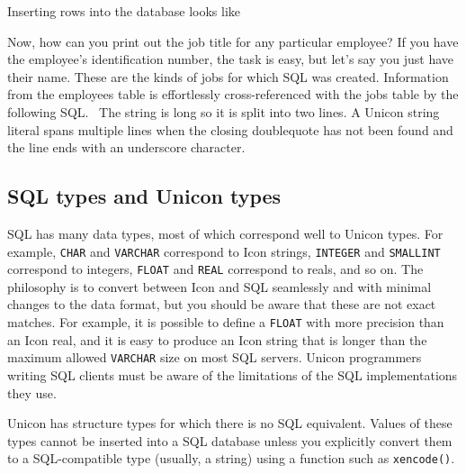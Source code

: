 
\noindent
Inserting rows into the database looks like


Now, how can you print out the job title for any particular employee? If
you have the employee's identification number, the
task is easy, but let's say you just have their name.
These are the kinds of jobs for which SQL was created. Information from
the employees table is effortlessly cross-referenced with the jobs
table by the following SQL. \ The string is long so it is split into
two lines. A Unicon string literal spans multiple lines when the
closing doublequote has not been found and the line ends with an
underscore character.


\subsection{SQL types and Unicon types}

SQL has many data types, most of which correspond well to Unicon types.
For example, \texttt{CHAR} and \texttt{VARCHAR} correspond to Icon
strings, \texttt{INTEGER} and \texttt{SMALLINT} correspond to integers,
\texttt{FLOAT} and \texttt{REAL} correspond to reals, and so on. The
philosophy is to convert between Icon and SQL seamlessly and with
minimal changes to the data format, but you should be aware that these
are not exact matches. For example, it is possible to define a
\texttt{FLOAT} with more precision than an Icon real, and it is easy to
produce an Icon string that is longer than the maximum allowed
\texttt{VARCHAR} size on most SQL servers. Unicon programmers writing
SQL clients must be aware of the limitations of the SQL implementations
they use.

Unicon has structure types for which there is no SQL equivalent. Values
of these types cannot be inserted into a SQL database unless you
explicitly convert them to a SQL-compatible type (usually, a string)
using a function such as \texttt{xencode()}.

